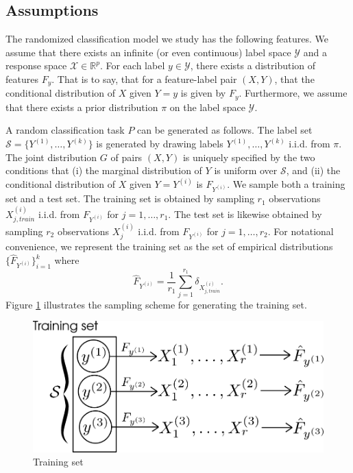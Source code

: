 \subsection{Assumptions}

The randomized classification model we study has the following
features.  We assume that there exists an infinite (or even
continuous) label space $\mathcal{Y}$ and a response space
$\mathcal{X} \in \mathbb{R}^p$.  For each label $y \in \mathcal{Y}$,
there exists a distribution of features $F_y$.  That is to say, that
for a feature-label pair $(X, Y)$, that the conditional distribution
of $X$ given $Y = y$ is given by $F_y$.  Furthermore, we assume that
there exists a prior distribution $\pi$ on the label space $\mathcal{Y}$.

A random classification task $P$ can be generated as follows.  The
label set $\mathcal{S} = \{Y^{(1)},\hdots, Y^{(k)}\}$ is generated by
drawing labels $Y^{(1)},\hdots, Y^{(k)}$ i.i.d. from $\pi$.  The joint
distribution $G$ of pairs $(X, Y)$ is uniquely specified by the two
conditions that (i) the marginal distribution of $Y$ is uniform over
$\mathcal{S}$, and (ii) the conditional distribution of $X$ given
$Y=Y^{(i)}$ is $F_{Y^{(i)}}$.  We sample both a training set and a
test set.  The training set is obtained by sampling $r_1$ observations
$X_{j, train}^{(i)}$ i.i.d. from $F_{Y^{(i)}}$ for $j = 1,\hdots,
r_1$.  The test set is likewise obtained by sampling $r_2$
observations $X_j^{(i)}$ i.i.d. from $F_{Y^{(i)}}$ for $j = 1,\hdots,
r_2$.  For notational convenience, we represent the training set as
the set of empirical distributions $\{\hat{F}_{Y^{(i)}}\}_{i=1}^k$
where
\[
\hat{F}_{Y^{(i)}} = \frac{1}{r_1} \sum_{j=1}^{r_1} \delta_{X^{(i)}_{j, train}}.
\]
Figure \ref{fig:training_set} illustrates the sampling scheme for
generating the training set.

\begin{figure}[h]
\centering
\includegraphics[scale = 0.4]{../extrapolation_figures/training_set.png}
\caption{Training set}\label{fig:training_set}
\end{figure}

